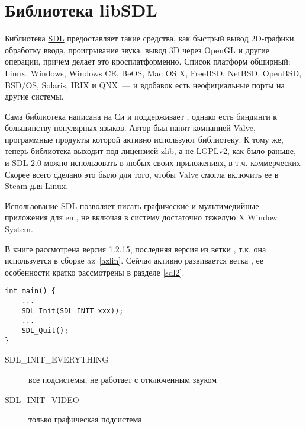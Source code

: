 \chapter{Библиотека libSDL}\secdown

Библиотека \href{http://www.libsdl.org/}{SDL} предоставляет такие средства, как
быстрый вывод 2D-графики, обработку ввода, проигрывание звука, вывод 3D через
OpenGL и другие операции, причем делает это кросплатформенно. Список платформ
обширный: Linux, Windows, Windows CE, BeOS, Mac OS X, FreeBSD, NetBSD, OpenBSD,
BSD/OS, Solaris, IRIX и QNX\ --- и вдобавок есть неофициальные порты на другие
системы.

Сама библиотека написана на Си и поддерживает \cpp, однако есть биндинги к
большинству популярных языков. Автор  был нанят компанией Valve,
программные продукты которой активно используют библиотеку. К тому же, теперь
библиотека выходит под лицензией zlib, а не LGPLv2, как было раньше, и SDL 2.0
можно использовать в любых своих приложениях, в т.ч. коммерческих Скорее всего
сделано это было для того, чтобы Valve смогла включить ее в Steam для Linux.

\bigskip
Использование SDL позволяет писать графические и мультимедийные приложения для
em\linux, не включая в систему достаточно тяжелую X Window System.

\bigskip
В книге рассмотрена версия 1.2.15, последняя версия из ветки , т.к.
она используется в сборке az\linux\ \ref{azlin}. Сейчаc активно развивается
ветка , ее особенности кратко рассмотрены в разделе \ref{sdl2}.


\begin{verbatim}
int main() {
	...
	SDL_Init(SDL_INIT_xxx));
	...
	SDL_Quit();
}
\end{verbatim}

\begin{description}
\item[SDL\_INIT\_EVERYTHING] все подсистемы, не работает с отключенным звуком
\item[SDL\_INIT\_VIDEO] только графическая подсистема
\end{description}




\label{sdl2}

\secup
